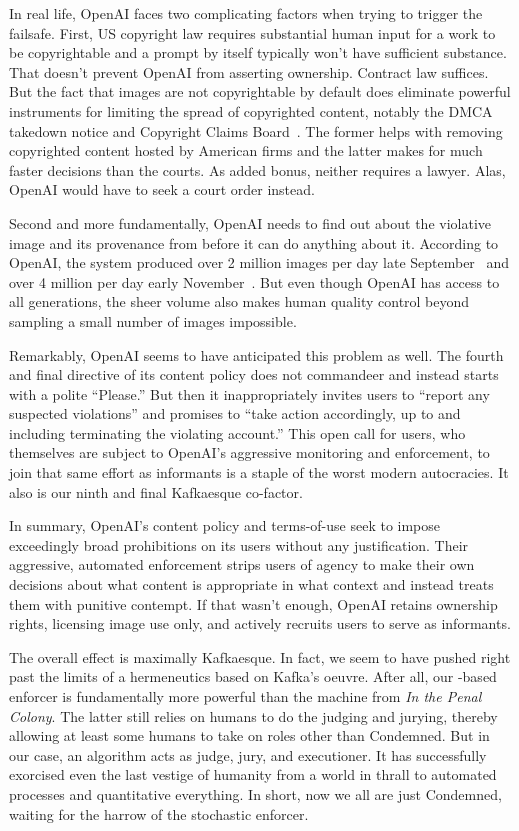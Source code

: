 In real life, OpenAI faces two complicating factors when trying to trigger the
failsafe. First, US copyright law requires substantial human input for a work to
be copyrightable and a prompt by itself typically won't have sufficient
substance. That doesn't prevent OpenAI from asserting ownership. Contract law
suffices. But the fact that images are not copyrightable by default does
eliminate powerful instruments for limiting the spread of copyrighted content,
notably the DMCA takedown notice and Copyright Claims
Board~\cite{CopyrightClaimsBoard2022}. The former helps with removing
copyrighted content hosted by American firms and the latter makes for much
faster decisions than the courts. As added bonus, neither requires a lawyer.
Alas, OpenAI would have to seek a court order instead.

Second and more fundamentally, OpenAI needs to find out about the violative
image and its provenance from \DALLE before it can do anything about it.
According to OpenAI, the system produced over 2 million images per day late
September~\cite{OpenAI2022a} and over 4 million per day early
November~\cite{OpenAI2022h}. But even though OpenAI has access to all
generations, the sheer volume also makes human quality control beyond sampling a
small number of images impossible.

Remarkably, OpenAI seems to have anticipated this problem as well. The fourth
and final directive of its content policy does not commandeer and instead starts
with a polite “Please.” But then it inappropriately invites users to “report any
suspected violations” and promises to “take action accordingly, up to and
including terminating the violating account.” This open call for users, who
themselves are subject to OpenAI's aggressive monitoring and enforcement, to
join that same effort as informants is a staple of the worst modern autocracies.
It also is our ninth and final Kafkaesque co-factor.

In summary, OpenAI's content policy and terms-of-use seek to impose exceedingly
broad prohibitions on its users without any justification. Their aggressive,
automated enforcement strips users of agency to make their own decisions about
what content is appropriate in what context and instead treats them with
punitive contempt. If that wasn't enough, OpenAI retains ownership rights,
licensing image use only, and actively recruits users to serve as informants.

The overall effect is maximally Kafkaesque. In fact, we seem to have pushed
right past the limits of a hermeneutics based on Kafka's oeuvre. After all, our
\AI-based enforcer is fundamentally more powerful than the machine from \emph{In
the Penal Colony}. The latter still relies on humans to do the judging and
jurying, thereby allowing at least some humans to take on roles other than
Condemned. But in our case, an algorithm acts as judge, jury, and executioner.
It has successfully exorcised even the last vestige of humanity from a world in
thrall to automated processes and quantitative everything. In short, now we all
are just Condemned, waiting for the harrow of the stochastic enforcer.

